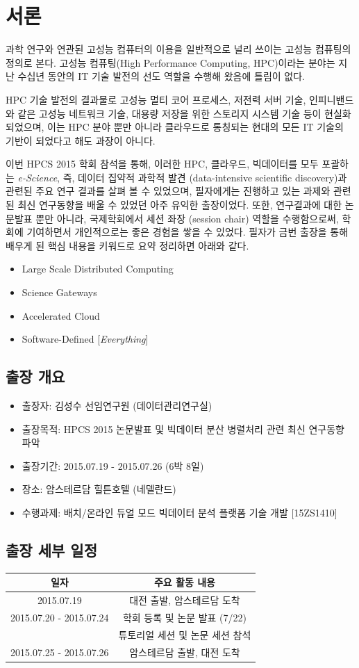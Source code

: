 \documentclass[twocolumn]{article}
\newcommand{\bi}{\begin{itemize}}
\newcommand{\ei}{\end{itemize}}
\newcommand{\ii}{\item}
\begin{document}
\section{서론}
과학 연구와 연관된 고성능 컴퓨터의 이용을 일반적으로 널리 쓰이는 고성능 컴퓨팅의 정의로 본다. 
고성능 컴퓨팅(High Performance Computing, HPC)이라는 분야는 지난 수십년 동안의 IT 기술 발전의 선도 역할을 수행해 왔음에 틀림이 없다. 

HPC 기술 발전의 결과물로 고성능 멀티 코어 프로세스, 저전력 서버 기술, 인피니밴드와 같은 고성능 네트워크 기술, 대용량 저장을 위한 스토리지 시스템 기술 등이 현실화되었으며, 이는 HPC 분야 뿐만 아니라 클라우드로 통칭되는 현대의 모든 IT 기술의 기반이 되었다고 해도 과장이 아니다.

이번 HPCS 2015 학회 참석을 통해, 이러한 HPC, 클라우드, 빅데이터를 모두 포괄하는\textit{ e-Science}, 즉, 데이터 집약적 과학적 발견 (data-intensive scientific discovery)과 관련된 주요 연구 결과를 살펴 볼 수 있었으며, 필자에게는 진행하고 있는 과제와 관련된 최신 연구동향을 배울 수 있었던 아주 유익한 출장이었다. 
또한, 연구결과에 대한 논문발표 뿐만 아니라, 국제학회에서 세션 좌장 (session chair) 역할을 수행함으로써, 학회에 기여하면서 개인적으로는 좋은 경험을 쌓을 수 있었다.
필자가 금번 출장을 통해 배우게 된 핵심 내용을 키워드로 요약 정리하면 아래와 같다.

\bi
\ii Large Scale Distributed Computing
\ii Science Gateways
\ii Accelerated Cloud
\ii Software-Defined [\textit{Everything}]
\ei
\subsection{출장 개요}

\bi
\ii 출장자: 김성수 선임연구원 (데이터관리연구실)
\ii 출장목적: HPCS 2015 논문발표 및 빅데이터 분산 병렬처리 관련 최신 연구동향 파악
\ii 출장기간: 2015.07.19 - 2015.07.26 (6박 8일)
\ii 장소: 암스테르담 힐튼호텔 (네델란드)
\ii 수행과제: 배치/온라인 듀얼 모드 빅데이터 분석 플랫폼 기술 개발 [15ZS1410]
\ei

\subsection{출장 세부 일정}

\begin{tabular}{ c | c } 
\hline	
\textbf{일자} & \textbf{주요 활동 내용} \\ 
\hline 
\hline
2015.07.19 & 대전 출발, 암스테르담 도착 \\ 
2015.07.20 - 2015.07.24 & 학회 등록 및 논문 발표 (7/22)  \\ 
 					 & 튜토리얼 세션 및 논문 세션 참석 \\ 
2015.07.25 - 2015.07.26 & 암스테르담 출발, 대전 도착 \\
\hline 
\end{tabular}
\end{document}
